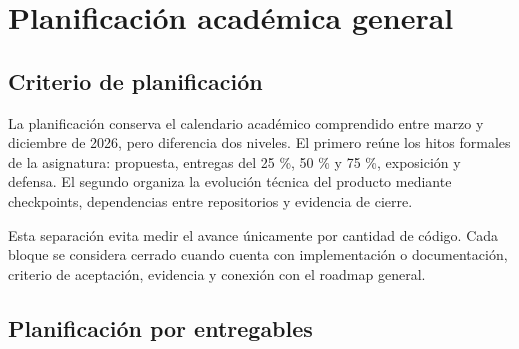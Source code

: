 \chapter{Planificación académica general}
\label{chap:planificacion-academica}

\section{Criterio de planificación}

La planificación conserva el calendario académico comprendido entre marzo y diciembre de 2026, pero diferencia dos niveles. El primero reúne los hitos formales de la asignatura: propuesta, entregas del 25 \%, 50 \% y 75 \%, exposición y defensa. El segundo organiza la evolución técnica del producto mediante checkpoints, dependencias entre repositorios y evidencia de cierre.

Esta separación evita medir el avance únicamente por cantidad de código. Cada bloque se considera cerrado cuando cuenta con implementación o documentación, criterio de aceptación, evidencia y conexión con el roadmap general.

\section{Planificación por entregables}

